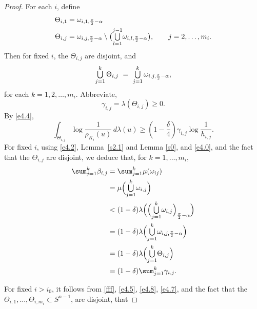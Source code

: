 \documentclass{cpamart1}     %
\theoremstyle{definition}
\theoremstyle{remark}
\newcommand*{\medcup}{\mathsmaller{\bigcup}}%
\newcommand{\sn}{S^{n-1}}
\begin{document}
\begin{proof}
For each $i$, define
\begin{align*}
\Theta_{i,1}&=\omega_{i,1,\frac\pi2-\alpha}\\
\Theta_{i,j}&=\omega_{i,j,\frac\pi2-\alpha}\setminus
\big(\medcup\limits_{l=1}^{j-1}\omega_{i,l,\frac\pi2-\alpha}\big), \qquad
j=2,\ldots,m_i.
\end{align*}
Then for fixed $i$, the $\Theta_{i,j}$ are disjoint, and
\begin{equation}\label{e4.0}
\medcup\limits_{j=1}^k \,\Theta_{i,j}\ =\ \medcup\limits_{j=1}^k\, \omega_{i,j,\frac\pi2-\alpha},
\end{equation}
for each $k=1, 2, \ldots, m_i$.
Abbreviate,
\[
\gamma_{i,j}=\lambda(\Theta_{i,j})\geq 0.
\]
By \eqref{e4.4},
\begin{equation}\label{e4.7}
\int_{\Theta_{i,j}}\log\frac1{\rho_{K_i}(u)}\,d\lambda(u)\geq
(1- {\textstyle\frac\delta4})\gamma_{i,j}\log \frac1{h_{i,j}}.
\end{equation}
For fixed $i$, using \eqref{e4.2}, Lemma~\ref{s2.1} and Lemma \ref{s0}, and \eqref{e4.0},
and the fact that the $\Theta_{i,j}$ are disjoint, we deduce that, for $k=1,\ldots,m_i$,
\begin{equation}\label{e4.8}
\begin{aligned}
\sum_{j=1}^k\beta_{i,j}
&=\sum_{j=1}^k \mu(\omega_{ij})\\
&=\mu\Big(\medcup\limits_{j=1}^k\omega_{i,j}\Big)\\
&<(1-\delta) \lambda\Big(\Big(\medcup\limits_{j=1}^{k}\omega_{i,j}\Big)_{\frac\pi2-\alpha}\Big)\\
&=(1-\delta)\lambda\Big(\medcup\limits_{j=1}^{k}\omega_{i,j,\frac\pi2-\alpha}\Big)\\
&=(1-\delta)\lambda\Big(\medcup\limits_{j=1}^k \Theta_{i,j}\Big)\\
&= (1-\delta)\sum_{j=1}^k\gamma_{i,j}.
\end{aligned}
\end{equation}


For fixed $i>i_0$, it follows from \eqref{fff}, \eqref{e4.5}, \eqref{e4.8}, \eqref{e4.7}, and the fact that the
$\Theta_{i,1},\ldots, \Theta_{i,m_i}\subset\sn$,
are disjoint, that



\end{proof}
\end{document}
